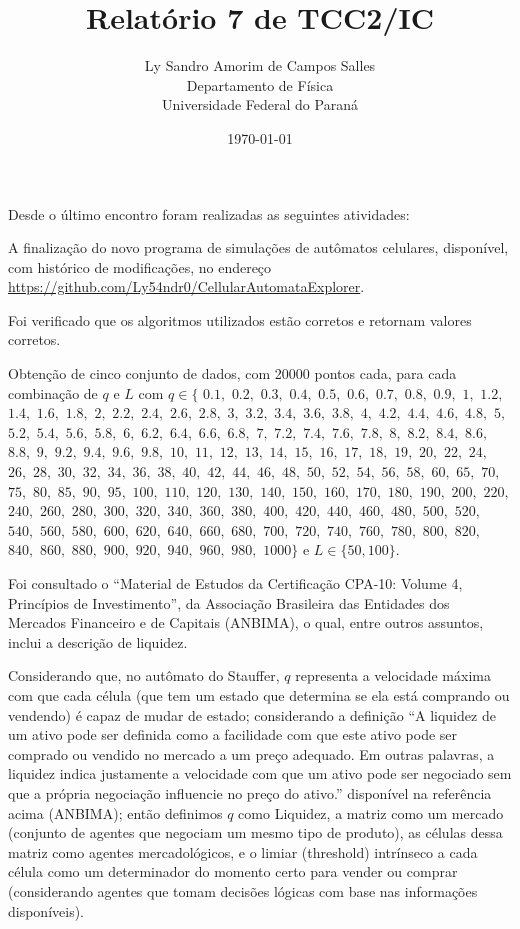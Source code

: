 \documentclass[12pt,a4paper,final]{article}
\title{Relatório 7 de TCC2/IC}
\author{Ly Sandro Amorim de Campos Salles\\Departamento de Física\\Universidade Federal do Paraná}
\date{\today}
\begin{document}
	\maketitle

  Desde o último encontro foram realizadas as seguintes atividades:

  A finalização do novo programa de simulações de autômatos celulares, disponível, com histórico de modificações, no endereço \url{https://github.com/Ly54ndr0/CellularAutomataExplorer}.

  Foi verificado que os algoritmos utilizados estão corretos e retornam valores corretos.

  Obtenção de cinco conjunto de dados, com 20000 pontos cada, para cada combinação de $q$ e $L$ com $q\in\{$ 
  $0.1,$ $0.2,$ $0.3,$ $0.4,$ $0.5,$ $0.6,$ $0.7,$ $0.8,$ $0.9,$
  $1,$ $1.2,$ $1.4,$ $1.6,$ $1.8,$ 
  $2,$ $2.2,$ $2.4,$ $2.6,$ $2.8,$ 
  $3,$ $3.2,$ $3.4,$ $3.6,$ $3.8,$
  $4,$ $4.2,$ $4.4,$ $4.6,$ $4.8,$
  $5,$ $5.2,$ $5.4,$ $5.6,$ $5.8,$
  $6,$ $6.2,$ $6.4,$ $6.6,$ $6.8,$
  $7,$ $7.2,$ $7.4,$ $7.6,$ $7.8,$
  $8,$ $8.2,$ $8.4,$ $8.6,$ $8.8,$
  $9,$ $9.2,$ $9.4,$ $9.6,$ $9.8,$ $10,$
  $11,$ $12,$ $13,$ $14,$ $15,$ $16,$ $17,$ $18,$ $19,$ $20,$
  $22,$ $24,$ $26,$ $28,$ $30,$ $32,$ $34,$ $36,$ $38,$ $40,$
  $42,$ $44,$ $46,$ $48,$ $50,$ $52,$ $54,$ $56,$ $58,$ $60,$
  $65,$ $70,$ $75,$ $80,$ $85,$ $90,$ $95,$ $100,$ $110,$
  $120,$ $130,$ $140,$ $150,$ $160,$ $170,$ $180,$ $190,$
  $200,$ $220,$ $240,$ $260,$ $280,$ $300,$ $320,$ $340,$ $360,$ $380,$
  $400,$ $420,$ $440,$ $460,$ $480,$ $500,$ $520,$ $540,$ $560,$ $580,$
  $600,$ $620,$ $640,$ $660,$ $680,$ $700,$ $720,$ $740,$ $760,$ $780,$
  $800,$ $820,$ $840,$ $860,$ $880,$ $900,$ $920,$ $940,$ $960,$ $980,$
  $1000\}$ e $L\in \{50, 100\}$.

  Foi consultado o ``Material de Estudos da Certificação CPA-10: Volume 4, Princípios de Investimento'', da Associação Brasileira das Entidades dos Mercados Financeiro e de Capitais (ANBIMA), o qual, entre outros assuntos, inclui a descrição de liquidez.
  
  Considerando que, no autômato do Stauffer, $q$ representa a velocidade máxima com que cada célula (que tem um estado que determina se ela está comprando ou vendendo) é capaz de mudar de estado; considerando a definição ``A liquidez de um ativo pode ser definida como a facilidade com que este ativo pode ser
  comprado ou vendido no mercado a um preço adequado. Em outras palavras, a liquidez indica
  justamente a velocidade com que um ativo pode ser negociado sem que a própria negociação
  influencie no preço do ativo.'' disponível na referência acima (ANBIMA); então definimos $q$ como Liquidez, a matriz como um mercado (conjunto de agentes que negociam um mesmo tipo de produto), as células dessa matriz como agentes mercadológicos, e o limiar (threshold) intrínseco a cada célula como um determinador do momento certo para vender ou comprar (considerando agentes que tomam decisões lógicas com base nas informações disponíveis). 
\end{document}
